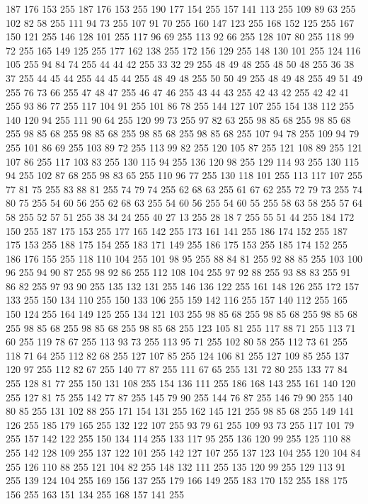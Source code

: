 187 176 153 255 187 176 153 255 190 177 154 255 157 141 113 255 109 89 63 255 102 82 58 255 111 94 73 255 107 91 70 255 160 147 123 255 168 152 125 255 167 150 121 255 146 128 101 255 117 96 69 255 113 92 66 255 128 107 80 255 118 99 72 255 165 149 125 255 177 162 138 255 172 156 129 255 148 130 101 255 124 116 105 255 94 84 74 255 44 44 42 255 33 32 29 255 48 49 48 255 48 50 48 255 36 38 37 255 44 45 44 255 44 45 44 255 48 49 48 255 50 50 49 255 48 49 48 255 49 51 49 255 76 73 66 255 47 48 47 255 46 47 46 255 43 44 43 255 42 43 42 255 42 42 41 255 93 86 77 255 117 104 91 255 101 86 78 255 144 127 107 255 154 138 112 255 140 120 94 255 111 90 64 255 120 99 73 255 97 82 63 255 98 85 68 255 98 85 68 255 98 85 68 255 98 85 68 255 98 85 68 255 98 85 68 255 107 94 78 255 109 94 79 255 101 86 69 255 103 89 72 255 113 99 82 255 120 105 87 255 121 108 89 255 121 107 86 255 117 103 83 255 130 115 94 255
136 120 98 255 129 114 93 255 130 115 94 255 102 87 68 255 98 83 65 255 110 96 77 255 130 118 101 255 113 117 107 255 77 81 75 255 83 88 81 255 74 79 74 255 62 68 63 255 61 67 62 255 72 79 73 255 74 80 75 255 54 60 56 255 62 68 63 255 54 60 56 255 54 60 55 255 58 63 58 255 57 64 58 255 52 57 51 255 38 34 24 255 40 27 13 255 28 18 7 255 55 51 44 255 184 172 150 255 187 175 153 255 177 165 142 255 173 161 141 255 186 174 152 255 187 175 153 255 188 175 154 255 183 171 149 255 186 175 153 255 185 174 152 255 186 176 155 255 118 110 104 255 101 98 95 255 88 84 81 255 92 88 85 255 103 100 96 255 94 90 87 255 98 92 86 255 112 108 104 255 97 92 88 255 93 88 83 255 91 86 82 255 97 93 90 255 135 132 131 255 146 136 122 255 161 148 126 255 172 157 133 255 150 134 110 255 150 133 106 255 159 142 116 255 157 140 112 255 165 150 124 255 164 149 125 255 134 121 103 255 98 85 68 255 98 85 68 255 98 85 68 255 98 85 68 255
98 85 68 255 98 85 68 255 123 105 81 255 117 88 71 255 113 71 60 255 119 78 67 255 113 93 73 255 113 95 71 255 102 80 58 255 112 73 61 255 118 71 64 255 112 82 68 255 127 107 85 255 124 106 81 255 127 109 85 255 137 120 97 255 112 82 67 255 140 77 87 255 111 67 65 255 131 72 80 255 133 77 84 255 128 81 77 255 150 131 108 255 154 136 111 255 186 168 143 255 161 140 120 255 127 81 75 255 142 77 87 255 145 79 90 255 144 76 87 255 146 79 90 255 140 80 85 255 131 102 88 255 171 154 131 255 162 145 121 255 98 85 68 255 149 141 126 255 185 179 165 255 132 122 107 255 93 79 61 255 109 93 73 255 117 101 79 255 157 142 122 255 150 134 114 255 133 117 95 255 136 120 99 255 125 110 88 255 142 128 109 255 137 122 101 255 142 127 107 255 137 123 104 255 120 104 84 255 126 110 88 255 121 104 82 255 148 132 111 255 135 120 99 255 129 113 91 255 139 124 104 255 169 156 137 255 179 166 149 255 183 170 152 255 188 175 156 255 163 151 134 255 168 157 141 255
